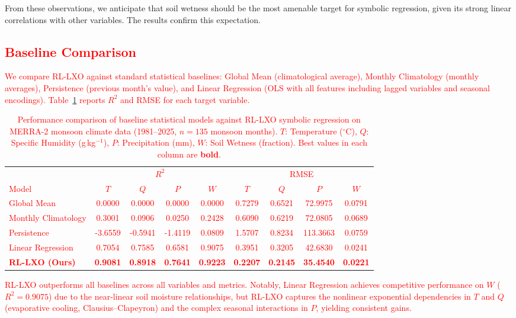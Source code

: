 \documentclass{article}
\begin{document}
From these observations, we anticipate that soil wetness should be the most amenable target for symbolic regression, given its strong linear correlations with other variables. The results confirm this expectation.

\textcolor{red}{
\subsection{Baseline Comparison}
We compare RL-LXO against standard statistical baselines: Global Mean (climatological average), Monthly Climatology (monthly averages), Persistence (previous month's value), and Linear Regression (OLS with all features including lagged variables and seasonal encodings). Table~\ref{tab:baselines} reports $R^2$ and RMSE for each target variable.

\begin{table}[H]
\centering
\caption{Performance comparison of baseline statistical models against RL-LXO symbolic regression on MERRA-2 monsoon climate data (1981--2025, $n=135$ monsoon months). $T$: Temperature ($^\circ$C), $Q$: Specific Humidity (g\,kg$^{-1}$), $P$: Precipitation (mm), $W$: Soil Wetness (fraction). Best values in each column are \textbf{bold}.}
\label{tab:baselines}
\begin{tabular}{l cccc cccc}
\toprule
 & \multicolumn{4}{c}{$R^{2}$} & \multicolumn{4}{c}{RMSE} \\
\cmidrule(lr){2-5} \cmidrule(lr){6-9}
Model & $T$ & $Q$ & $P$ & $W$ & $T$ & $Q$ & $P$ & $W$ \\
\midrule
Global Mean & 0.0000 & 0.0000 & 0.0000 & 0.0000 & 0.7279 & 0.6521 & 72.9975 & 0.0791 \\
Monthly Climatology & 0.3001 & 0.0906 & 0.0250 & 0.2428 & 0.6090 & 0.6219 & 72.0805 & 0.0689 \\
Persistence & -3.6559 & -0.5941 & -1.4119 & 0.0809 & 1.5707 & 0.8234 & 113.3663 & 0.0759 \\
Linear Regression & 0.7054 & 0.7585 & 0.6581 & 0.9075 & 0.3951 & 0.3205 & 42.6830 & 0.0241 \\
\textbf{RL-LXO (Ours)} & \textbf{0.9081} & \textbf{0.8918} & \textbf{0.7641} & \textbf{0.9223} & \textbf{0.2207} & \textbf{0.2145} & \textbf{35.4540} & \textbf{0.0221} \\
\bottomrule
\end{tabular}
\end{table}

RL-LXO outperforms all baselines across all variables and metrics. Notably, Linear Regression achieves competitive performance on $W$ ($R^2=0.9075$) due to the near-linear soil moisture relationships, but RL-LXO captures the nonlinear exponential dependencies in $T$ and $Q$ (evaporative cooling, Clausius--Clapeyron) and the complex seasonal interactions in $P$, yielding consistent gains.
}
\end{document}
